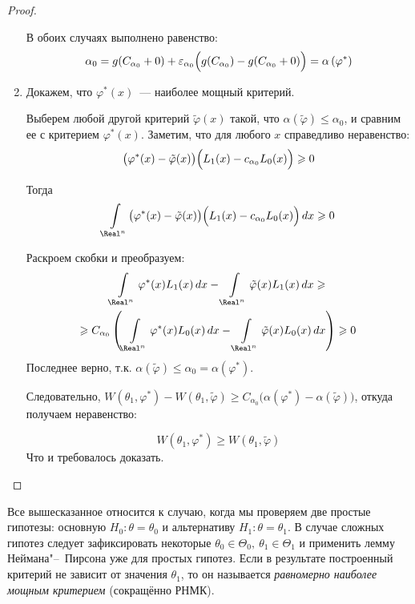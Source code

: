 \begin{proof}
\begin{enumerate}
    В обоих случаях выполнено равенство:
    \begin{equation*}
        \alpha_{0} = 
        g(C_{\alpha_{0}} + 0) + \varepsilon_{\alpha_{0}}\Bigl(g(C_{\alpha_{0}}) - g(C_{\alpha_{0}} + 0)\Bigr) =
        \alpha\left(\varphi^{*}\right)
    \end{equation*}

    \item Докажем, что $\varphi^{*}(x)$~--- наиболее мощный критерий.

    Выберем любой другой критерий $\tilde{\varphi}(x)$ такой, что $\alpha(\tilde{\varphi}) \leqslant \alpha_{0}$, 
    и сравним ее с критерием $\varphi^{*}(x)$. 
    Заметим, что для любого $x$ справедливо неравенство:
    \begin{equation*}
        \bigl(\varphi^{*}(x)-\tilde{\varphi}(x)\bigr) \Bigl(L_{1}(x)-c_{\alpha_{0}} L_{0}(x)\Bigr) \geqslant 0
    \end{equation*}

    Тогда
    \begin{equation*}
        \int\limits_{\Real^{n}} \bigl(\varphi^{*}(x)-\tilde{\varphi}(x)\bigr) \Bigl(L_{1}(x)-c_{\alpha_{0}} L_{0}(x)\Bigr) \, dx \geqslant 0
    \end{equation*}

    Раскроем скобки и преобразуем:
    \begin{multline*}
        \int\limits_{\Real^{n}} \varphi^{*}(x) L_{1}(x) \, dx - \int\limits_{\Real^{n}} \tilde{\varphi}(x) L_{1}(x) \,dx \geqslant \\
        \geqslant C_{\alpha_{0}}\left(\int\limits_{\Real^{n}} \varphi^{*}(x) L_{0}(x) \,dx - \int\limits_{\Real^{n}} \tilde{\varphi}(x) L_{0}(x) \,dx\right) \geqslant 0
    \end{multline*}
    Последнее верно, т.к. $\alpha(\tilde{\varphi}) \leqslant \alpha_0 = \alpha(\varphi^*)$.
    
    \smallskip
    Следовательно, $W \left(\theta_1, \varphi^{*}\right) - W(\theta_1, \tilde{\varphi}) \geqslant C_{\alpha_{0}}\bigl(\alpha\left(\varphi^{*}\right)-\alpha(\tilde{\varphi})\bigr)$, откуда получаем неравенство:

    \begin{equation*}
        W\left(\theta_1, \varphi^{*}\right) \geqslant W(\theta_1, \tilde{\varphi})
    \end{equation*}
    Что и требовалось доказать.
    \end{enumerate}
\end{proof}

\begin{rmrk}
    Все вышесказанное относится к случаю, когда мы проверяем две простые гипотезы: основную $H_0\colon \theta = \theta_0$ и альтернативу $H_1\colon \theta = \theta_1$.
    В случае сложных гипотез следует зафиксировать некоторые $\theta_0 \in \Theta_0, \: \theta_1 \in \Theta_1$ и применить лемму Неймана"--~Пирсона уже для простых гипотез.
    Если в результате построенный критерий не зависит от значения $\theta_1$, то он называется \textit{равномерно наиболее мощным критерием} (сокращённо РНМК).
\end{rmrk}
